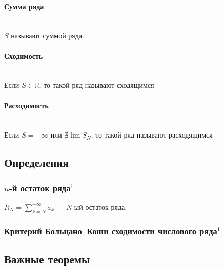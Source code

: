 \documentclass{article}
\let\vanillaparagraph\paragraph
\renewcommand{\paragraph}[1]{\vanillaparagraph{#1}\mbox{}\\}
\begin{document}
\paragraph{Сумма ряда}
$S$ называют суммой ряда.
\paragraph{Сходимость}
Если $S \in \mathbb{R}$, то такой ряд называют сходящимся
\paragraph{Расходимость}
Если $S = \pm\infty$ или $\nexists \lim S_N$, то такой ряд называют расходящимся



\newpage
\subsection{Определения}

\subsubsection{\texorpdfstring{$n$}{n}-й остаток ряда\texorpdfstring{$^1$}{}}
$R_N = \sum_{k=N}^{+\infty} a_k$ --- $N$-ый остаток ряда.

\subsubsection{Критерий Больцано--Коши сходимости числового ряда\texorpdfstring{$^1$}{}}

\newpage
\subsection{Важные теоремы}
\end{document}
